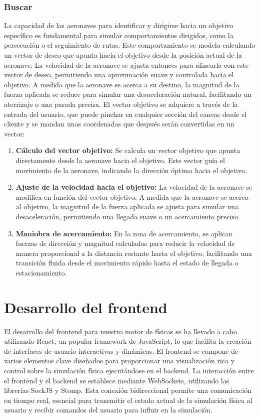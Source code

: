 \subsubsection{Buscar}
La capacidad de las aeronaves para identificar y dirigirse hacia un objetivo específico es fundamental para simular comportamientos dirigidos, como la persecución o el seguimiento de rutas. Este comportamiento se modela calculando un vector de deseo que apunta hacia el objetivo desde la posición actual de la aeronave. La velocidad de la aeronave se ajusta entonces para alinearla con este vector de deseo, permitiendo una aproximación suave y controlada hacia el objetivo. A medida que la aeronave se acerca a su destino, la magnitud de la fuerza aplicada se reduce para simular una desaceleración natural, facilitando un aterrizaje o una parada precisa.
El vector objetivo se adquiere a través de la entrada del usuario, que puede pinchar en cualquier sección del canvas desde el cliente y se mandan unas coordenadas que después serán convertidas en un vector:
\begin{enumerate}
    \item \textbf{Cálculo del vector objetivo:} Se calcula un vector objetivo que apunta directamente desde la aeronave hacia el objetivo. Este vector guía el movimiento de la aeronave, indicando la dirección óptima hacia el objetivo.
    \item \textbf{Ajuste de la velocidad hacia el objetivo:} La velocidad de la aeronave se modifica en función del vector objetivo. A medida que la aeronave se acerca al objetivo, la magnitud de la fuerza aplicada se ajusta para simular una desaceleración, permitiendo una llegada suave o un acercamiento preciso.
    \item \textbf{Maniobra de acercamiento:} En la zona de acercamiento, se aplican fuerzas de dirección y magnitud calculadas para reducir la velocidad de manera proporcional a la distancia restante hasta el objetivo, facilitando una transición fluida desde el movimiento rápido hasta el estado de llegada o estacionamiento.
\end{enumerate}
\section{Desarrollo del frontend}
El desarrollo del frontend para nuestro motor de físicas se ha llevado a cabo utilizando React, un popular framework de JavaScript, lo que facilita la creación de interfaces de usuario interactivas y dinámicas. El frontend se compone de varios elementos clave diseñados para proporcionar una visualización rica y control sobre la simulación física ejecutándose en el backend.
La interacción entre el frontend y el backend se establece mediante WebSockets, utilizando las librerías SockJS y Stomp. Esta conexión bidireccional permite una comunicación en tiempo real, esencial para transmitir el estado actual de la simulación física al usuario y recibir comandos del usuario para influir en la simulación.
